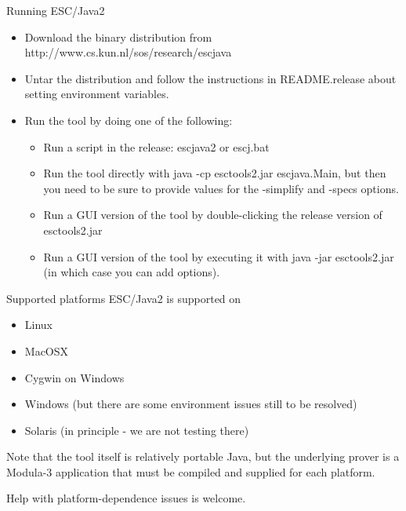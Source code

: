 \documentclass[
pdf,
nocolorBG,
slideColor,
cok,
]{prosper}
\begin{document}


\begin{slide}{Running ESC/Java2}
\vspace*{-6ex}
\begin{itemize}
\item Download the binary distribution from {\green http://www.cs.kun.nl/sos/research/escjava}
\item Untar the distribution and follow the instructions in {\green README.release} about setting environment variables.
\item Run the tool by doing one of the following:
\begin{itemize}
\item Run a script in the release: {\green escjava2} or {\green escj.bat}
\item Run the tool directly with {\green java -cp esctools2.jar escjava.Main}, but then you need to be sure to provide values for the {\blue -simplify} and {\blue -specs}  options.
\item Run a GUI version of the tool by double-clicking the release version of {\green esctools2.jar}
\item Run a GUI version of the tool by executing it with {\green java -jar esctools2.jar} (in which case you can add options).
\end{itemize}
\end{itemize}
\end{slide}



\begin{slide}{Supported platforms}
\vspace*{-6ex}
ESC/Java2 is supported on
\begin{itemize}
\item Linux
\item MacOSX
\item Cygwin on Windows
\item Windows (but there are some environment issues still to be resolved)
\item Solaris (in principle - we are not testing there)
\end{itemize}
Note that the tool itself is relatively portable Java, but the underlying prover is a Modula-3 application that must be compiled and supplied for each platform.

Help with platform-dependence issues is welcome.
\end{slide}
\end{document}

